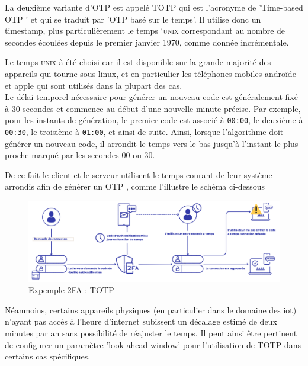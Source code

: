 \documentclass[a4paper, 10pt]{article}
\newcommand{\otp}{\textsc{OTP} }
\newcommand{\totp}{\textsc{TOTP} }
\begin{document}
    La deuxième variante d'\otp est appelé \totp 
qui est l'acronyme de \textcolor{myblue}{'Time-based \otp'} et qui se traduit par '\otp basé sur le temps'. Il utilise donc un timestamp, plus particulièrement \textcolor{mygreen}{le temps `\textsc{unix}} correspondant au nombre de secondes écoulées depuis le premier janvier 1970, comme donnée incrémentale. 

Le temps \textsc{unix} à été choisi car il est disponible sur la grande majorité des appareils qui tourne sous linux, et en particulier les téléphones mobiles androïde et apple qui sont utilisés dans la plupart des cas.\\

Le \textcolor{myblue}{délai temporel} nécessaire pour générer un nouveau code est généralement fixé à \textcolor{mygreen}{30 secondes} et commence au début d'une nouvelle minute précise. Par exemple, pour les instants de génération, le premier code est associé à \texttt{00:00}, le deuxième à \texttt{00:30}, le troisième à \texttt{01:00}, et ainsi de suite. Ainsi, lorsque l'algorithme doit générer un nouveau code, il \textcolor{myblue}{arrondit le temps vers le bas} jusqu'à l'instant le plus proche marqué par les secondes \textcolor{myblue}{00 ou 30}.


    De ce fait le client et le serveur utilisent le temps courant de leur système arrondis afin de générer un \otp, comme l'illustre le schéma ci-dessous

\begin{figure}[H]
        \centering
        \includegraphics[scale=0.30]{img/1/3/2FA-totp.png}
        \caption{Expemple 2FA : \totp\\}
        \label{fig:2fa-totp}
\end{figure}


    Néanmoins, certains appareils physiques (en particulier dans le domaine des iot) n'ayant pas accès à l'heure d'internet
subissent un \textcolor{myblue}{décalage estimé de deux minutes par an} sans possibilité de réajuster le temps. 
Il peut ainsi être pertinent de configurer un \textcolor{mygreen}{paramètre 'look ahead window'} pour l'utilisation de \totp dans certains \textcolor{myblue}{cas spécifiques.}\\
\end{document}

